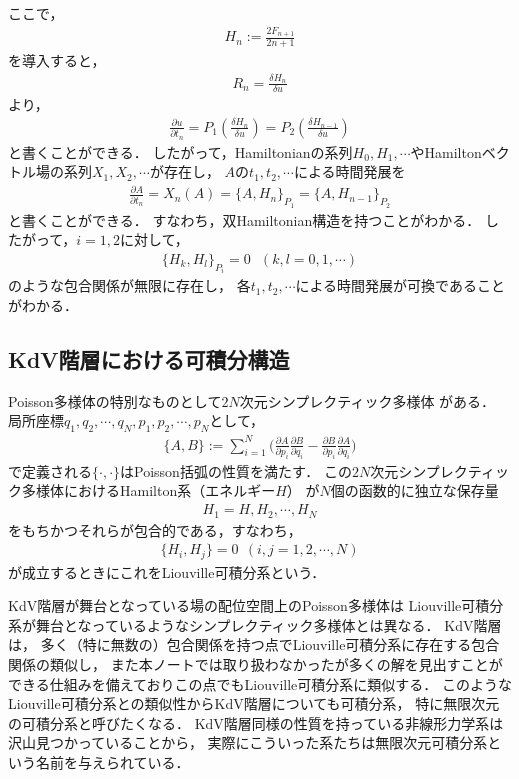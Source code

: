 \documentclass[dvipdfmx,12pt,a4paper,uplatex]{jsarticle}
\theoremstyle{plain}
\theoremstyle{definition}
\begin{document}
ここで，
\begin{align}
H_n:= \frac{2 F_{n+1}}{2n+1} 
\end{align}
を導入すると，
\begin{align}
R_n=\frac{\delta H_n}{\delta u}
\end{align}
より，
\begin{align}
\frac{\partial u}{\partial t_n} 
= P_1\left(\frac{\delta H_n}{\delta u}\right)
= P_2\left(\frac{\delta H_{n-1}}{\delta u}\right)
\end{align}
と書くことができる．
したがって，Hamiltonianの系列$H_0,H_1,\cdots$やHamiltonベクトル場の系列$X_1,X_2,\cdots$が存在し，
$A$の$t_1,t_2,\cdots$による時間発展を
\begin{align}
\frac{\partial A}{\partial t_n} 
=
X_n(A)
=
\{A,H_{n} \}_{P_1} = \{A,H_{n-1} \}_{P_2}
\end{align}
と書くことができる．
すなわち，双Hamiltonian構造を持つことがわかる．
したがって，$i=1,2$に対して，
\begin{align}
\{H_{k},H_{l}\}_{P_i} = 0 \ \ \ (k,l=0,1,\cdots)
\end{align}
のような包合関係が無限に存在し，
各$t_1,t_2,\cdots$による時間発展が可換であることがわかる．

\subsection{KdV階層における可積分構造}
Poisson多様体の特別なものとして$2N$次元シンプレクティック多様体
がある．
局所座標$q_1,q_2,\cdots,q_N,p_1,p_2,\cdots,p_N$として，
\begin{align}
\{A,B\}:=\sum _{i=1}^N{\biggl (}{\frac  {\partial A}{\partial p_{i}}}{\frac  {\partial B}{\partial q_{i}}}-{\frac  {\partial B}{\partial p_{i}}}{\frac  {\partial A}{\partial q_{i}}}{\biggr )}
\end{align}
で定義される$\{\cdot,\cdot\}$はPoisson括弧の性質を満たす．
この$2N$次元シンプレクティック多様体におけるHamilton系（エネルギー$H$）
が$N$個の函数的に独立な保存量
\begin{align*}
H_1=H,H_2,\cdots, H_N 
\end{align*}
をもちかつそれらが包合的である，すなわち，
\begin{align}
\{H_i , H_j \} = 0 \ \ (i,j=1,2,\cdots,N)    
\end{align}
が成立するときにこれをLiouville可積分系という．

KdV階層が舞台となっている場の配位空間上のPoisson多様体は
Liouville可積分系が舞台となっているようなシンプレクティック多様体とは異なる．
KdV階層は，
多く（特に無数の）包合関係を持つ点でLiouville可積分系に存在する包合関係の類似し，
また本ノートでは取り扱わなかったが多くの解を見出すことができる仕組みを備えておりこの点でもLiouville可積分系に類似する．
このようなLiouville可積分系との類似性からKdV階層についても可積分系，
特に無限次元の可積分系と呼びたくなる．
KdV階層同様の性質を持っている非線形力学系は沢山見つかっていることから，
実際にこういった系たちは無限次元可積分系という名前を与えられている．
\end{document}
